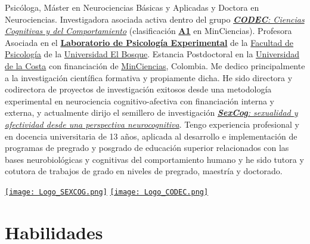 \documentclass[11pt,a4paper,]{awesome-cv}
\begin{document}
\begin{minipage}[c]{0.85\linewidth}
Psicóloga, Máster en Neurociencias Básicas y Aplicadas y Doctora en Neurociencias. Investigadora asociada activa dentro del grupo \href{https://investigaciones.unbosque.edu.co/codec}{\textit{\textbf{CODEC}: Ciencias Cognitivas y del Comportamiento}} (clasificación  \href{https://scienti.minciencias.gov.co/gruplac/jsp/visualiza/visualizagr.jsp?nro=00000000001446}{\textbf{A1}} en MinCiencias). Profesora Asociada en el \href{https://grupo-codec.netlify.app/labpsiexp/}{\textbf{Laboratorio de Psicología Experimental}} de la \href{https://www.uelbosque.edu.co/psicologia}{Facultad de Psicología} de la \href{https://www.uelbosque.edu.co/}{Universidad El Bosque}. Estancia Postdoctoral en la \href{https://www.cuc.edu.co/}{Universidad de la Costa} con financiación de \href{https://minciencias.gov.co/}{MinCiencias}, Colombia. Me dedico principalmente a la investigación científica formativa y propiamente dicha. He sido directora y codirectora de proyectos de investigación exitosos desde una metodología experimental en neurociencia cognitivo-afectiva con financiación interna y externa, y actualmente dirijo el semillero de investigación \href{https://grupo-codec.netlify.app/sexcog/}{\textit{\textbf{SexCog}: sexualidad y afectividad desde una perspectiva neurocognitiva}}. Tengo experiencia profesional y en docencia universitaria de 13 años, aplicada al desarrollo e implementación de programas de pregrado y posgrado de educación superior relacionados con las bases neurobiológicas y cognitivas del comportamiento humano y he sido tutora y cotutora de trabajos de grado en niveles de pregrado, maestría y doctorado.
\end{minipage} \begin{minipage}[c]{0.15\linewidth}
\begin{flushright} 
\hfill \href{https://grupo-codec.netlify.app/sexcog/}{\texttt{[image: Logo\_SEXCOG.png]}} \newline \href{https://investigaciones.unbosque.edu.co/codec}{\texttt{[image: Logo\_CODEC.png]}}
\end{flushright}
\end{minipage}

\section{Habilidades}\label{habilidades}
\end{document}
